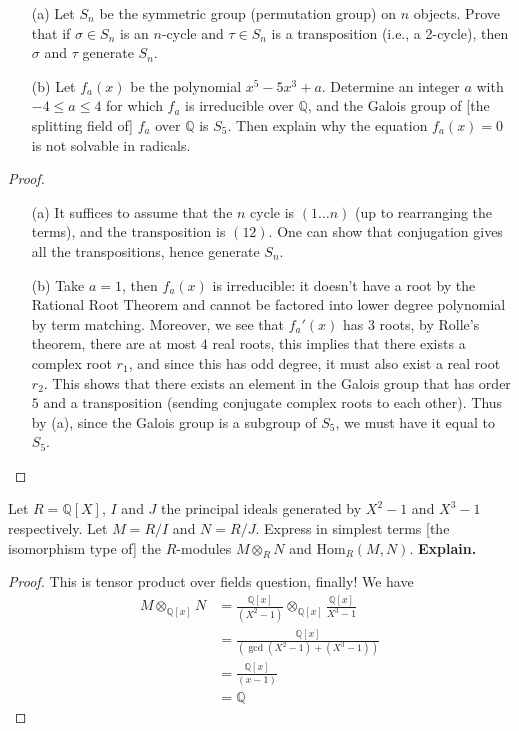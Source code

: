 \documentclass[openany]{book}
\newcommand{\Q}{\mathbb{Q}}
\begin{document}
\begin{prob}
    \begin{itemize}
        \item[(a)] Let \(S_n\) be the symmetric group (permutation group) on \(n\) objects. Prove that if \(\sigma \in S_n\) is an \(n\)-cycle and \(\tau \in S_n\) is a transposition (i.e., a 2-cycle), then \(\sigma\) and \(\tau\) generate \(S_n\).
        \item[(b)] Let \(f_a(x)\) be the polynomial \(x^5 - 5x^3 + a\). Determine an integer \(a\) with \(-4 \leq a \leq 4\) for which \(f_a\) is irreducible over \(\mathbb{Q}\), and the Galois group of [the splitting field of] \(f_a\) over \(\mathbb{Q}\) is \(S_5\). Then explain why the equation \(f_a(x) = 0\) is not solvable in radicals.
    \end{itemize}
\end{prob}
\begin{proof}
    \begin{itemize}
        \item[(a)] It suffices to assume that the $n$ cycle is $(1\dots n)$ (up to rearranging the terms), and the transposition is $(12)$. One can show that conjugation gives all the transpositions, hence generate $S_n$.
        \item[(b)] Take $a=1$, then $f_a(x)$ is irreducible: it doesn't have a root by the Rational Root Theorem and cannot be factored into lower degree polynomial by term matching. Moreover, we see that $f_a'(x)$ has $3$ roots, by Rolle's theorem, there are at most $4$ real roots, this implies that there exists a complex root $r_1$, and since this has odd degree, it must also exist a real root $r_2$. This shows that there exists an element in the Galois group that has order $5$ and a transposition (sending conjugate complex roots to each other). Thus by (a), since the Galois group is a subgroup of $S_5$, we must have it equal to $S_5$. 
    \end{itemize}
\end{proof}



\begin{prob}
    Let \(R = \mathbb{Q}[X]\), \(I\) and \(J\) the principal ideals generated by \(X^2 - 1\) and \(X^3 - 1\) respectively. Let \(M = R/I\) and \(N = R/J\). Express in simplest terms [the isomorphism type of] the \(R\)-modules \(M \otimes_R N\) and \(\text{Hom}_R(M, N)\). \textbf{Explain.}
\end{prob}
\begin{proof}
    This is tensor product over fields question, finally! We have 
    \begin{align*}
        M\otimes_{\Q[x]}N&=\frac{\Q[x]}{(X^2-1)}\otimes_{\Q[x]}\frac{\Q[x]}{X^3-1}\\
        &=\frac{\Q[x]}{\left(\gcd(X^2-1)+(X^3-1)\right)}\\
        &=\frac{\Q[x]}{(x-1)}\\
        &=\Q
    \end{align*}
    
\end{proof}
\end{document}
